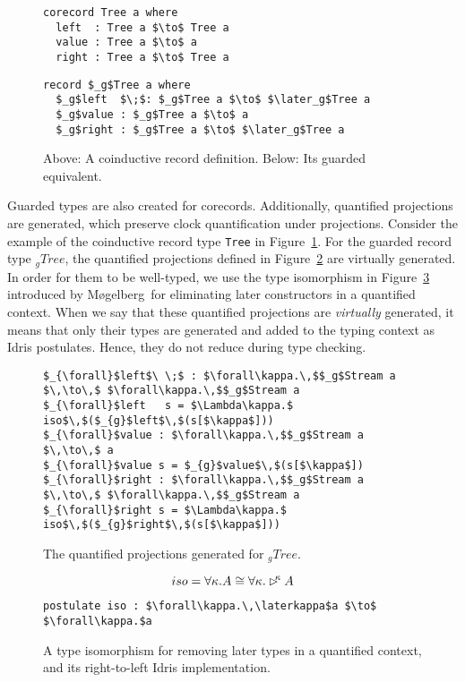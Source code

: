 \begin{figure}[h]
\begin{lstlisting}[mathescape]
corecord Tree a where
  left  : Tree a $\to$ Tree a
  value : Tree a $\to$ a
  right : Tree a $\to$ Tree a
\end{lstlisting}
\begin{lstlisting}[mathescape]
record $_g$Tree a where
  $_g$left  $\;$: $_g$Tree a $\to$ $\later_g$Tree a
  $_g$value : $_g$Tree a $\to$ a
  $_g$right : $_g$Tree a $\to$ $\later_g$Tree a
\end{lstlisting}
  \caption{Above: A coinductive record definition. Below: Its guarded equivalent.}
  \label{fig:guarded_tree_inf}
\end{figure}

Guarded types are also created for corecords. Additionally, quantified
projections are generated, which preserve clock quantification under
projections. Consider the example of the coinductive record type \texttt{Tree}
in Figure~\ref{fig:guarded_tree_inf}. For the guarded record type $_{g}Tree$, the
quantified projections defined in Figure~\ref{fig:tree_quantified_projections}
are virtually generated. In order for them to be well-typed, we use the type
isomorphism in Figure~\ref{fig:quantified_later_iso} introduced by
Møgelberg\,\citep{Mogelberg:2014} for eliminating later constructors in a
quantified context. When we say that these quantified projections are
\emph{virtually} generated, it means that only their types are generated and
added to the typing context as Idris postulates. Hence, they do not reduce
during type checking. 

\begin{figure}[h]
\begin{lstlisting}[mathescape]
$_{\forall}$left$\ \;$ : $\forall\kappa.\,$$_g$Stream a $\,\to\,$ $\forall\kappa.\,$$_g$Stream a
$_{\forall}$left   s = $\Lambda\kappa.$ iso$\,$($_{g}$left$\,$(s[$\kappa$]))
$_{\forall}$value : $\forall\kappa.\,$$_g$Stream a $\,\to\,$ a
$_{\forall}$value s = $_{g}$value$\,$(s[$\kappa$])
$_{\forall}$right : $\forall\kappa.\,$$_g$Stream a $\,\to\,$ $\forall\kappa.\,$$_g$Stream a
$_{\forall}$right s = $\Lambda\kappa.$ iso$\,$($_{g}$right$\,$(s[$\kappa$]))
\end{lstlisting}
  \caption{The quantified projections generated for $_{g}Tree$.}
\label{fig:tree_quantified_projections}
\end{figure}

\begin{figure}[h]
\[
iso = \forall \kappa .A\cong \forall\kappa.\rhd^{\!\!\kappa} A
\]
\begin{lstlisting}[mathescape]
postulate iso : $\forall\kappa.\,\laterkappa$a $\to$ $\forall\kappa.$a
\end{lstlisting}
  \caption{A type isomorphism for removing later types in a quantified context, and
    its right-to-left Idris implementation.}
\label{fig:quantified_later_iso}
\end{figure}

